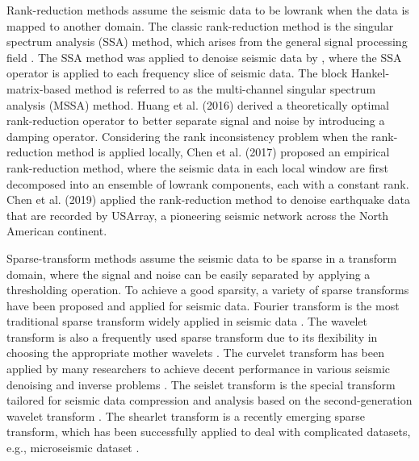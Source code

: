 Rank-reduction methods assume the seismic data to be lowrank when the data is mapped to another domain. The classic rank-reduction method is the singular spectrum analysis (SSA) method, which arises from the general signal processing field \cite{ssa}. The SSA method was applied to denoise seismic data by  \cite{mssa}, where the SSA operator is applied to each frequency slice of seismic data.  The block Hankel-matrix-based method is referred to as the multi-channel singular spectrum analysis (MSSA) method. Huang et al. (2016) \cite{weilin2016dmssa} derived a theoretically optimal rank-reduction operator to better separate signal and noise by introducing a damping operator. Considering the rank inconsistency problem \cite{shaohuan2017gji,wang2020low} when the rank-reduction method is applied locally, Chen et al. (2017) \cite{yangkang2017ieee} proposed an empirical rank-reduction method, where the seismic data in each local window are first decomposed into an ensemble of lowrank components, each with a constant rank. Chen et al. (2019) \cite{yangkang2019nc} applied the rank-reduction method to denoise earthquake data that are recorded by USArray, a pioneering seismic network across the North American continent. 


Sparse-transform methods assume the seismic data to be sparse in a transform domain, where the signal and noise can be easily separated by applying a thresholding operation.  To achieve a good sparsity, a variety of sparse transforms have been proposed and applied for seismic data. Fourier transform is the most traditional sparse transform widely applied in seismic data \cite{abma2009}. The wavelet transform is also a frequently used sparse transform due to its flexibility in choosing the appropriate mother wavelets \cite{mostafa2016geo}. The curvelet transform has been applied by many researchers to achieve decent performance in various seismic denoising and inverse problems \cite{neelamani2008,candes2009}. The seislet transform is the special transform tailored for seismic data compression and analysis based on the second-generation wavelet transform \cite{fomel2010seislet,yangkang20142}. The shearlet transform is a recently emerging sparse transform, which has been successfully applied to deal with complicated datasets, e.g., microseismic dataset \cite{zhang2018multicomponent}. 
%

